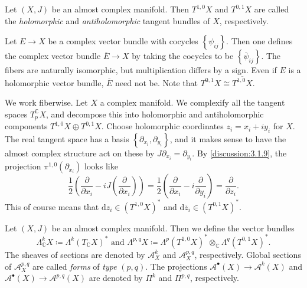 \begin{definition}\label{dfn:3.2.6}
	Let $(X,J)$ be an almost complex manifold. Then $T^{1,0} X$ and $T^{0,1} X$ are called the \emph{holomorphic} and \emph{antiholomorphic} tangent bundles of $X$, respectively.
\end{definition}
\begin{remark}\label{rmk:3.2.7}
	Let $E\to X$ be a complex vector bundle with cocycles $\left\{ \psi _{ij}  \right\} $. Then one defines the complex vector bundle $\overline{E} \to X$ by taking the cocycles to be $\left\{ \overline{\psi } _{ij}  \right\} $. The fibers are naturally isomorphic, but multiplication differs by a sign. Even if $E$ is a holomorphic vector bundle, $\overline{E} $ need not be. Note that $T^{0,1} X \cong \overline{T^{1,0} X} $.
\end{remark}
\begin{intuition}\label{intuition:3.2.8}
	We work fiberwise. Let $X$ a complex manifold. We complexify all the tangent spaces $T_p^\mathbb{C} X$, and decompose this into holomorphic and antiholomorphic components $T^{1,0} X \oplus T^{0,1} X$. Choose holomorphic coordinates $z_i = x_i + iy_i$ for $X$. The real tangent space has a basis $\left\{ \partial _{x_i} ,\partial _{y_i}  \right\} $, and it makes sense to have the almost complex structure act on these by $J\partial _{x_i} =\partial _{y_i} $. By \cref{discussion:3.1.9}, the projection $\pi ^{1,0} (\partial _{x_i} )$ looks like
	\[
		\frac{1}{2} \left( \frac{\partial }{\partial x_i} -i J\left( \frac{\partial }{\partial x_i}  \right)  \right) =\frac{1}{2} \left( \frac{\partial }{\partial x_i} -i \frac{\partial }{\partial y_i}  \right)=\frac{\partial }{\partial z_i}
	.\]
	This of course means that $\mathrm{d} z_i\in (T^{1,0} X)^*$ and $\mathrm{d} \overline{z} _i\in (T^{0,1} X)^*$.
\end{intuition}

\begin{definition}\label{dfn:3.2.9}
	Let $(X,J)$ be an almost complex manifold. Then we define the vector bundles
	\[
		\Lambda_\mathbb{C}^kX \coloneqq \Lambda ^k(T_\mathbb{C} X)^*\text{ and } \Lambda ^{p,q}X\coloneqq \Lambda ^p(T^{1,0} X)^*\otimes _\mathbb{C} \Lambda ^q(T^{0,1} X)^*
	.\]
	The sheaves of sections are denoted by $\mathcal{A} ^k_X$ and $\mathcal{A} ^{p,q} _X$, respectively. Global sections of $\mathcal{A} ^{p,q}_X$ are called \emph{forms} of \emph{type} $(p,q)$. The projections $\mathcal{A} ^{\bullet}(X)\to \mathcal{A} ^{k} (X)$ and $\mathcal{A} ^{\bullet} (X)\to \mathcal{A} ^{p,q} (X)$ are denoted by $\Pi ^k$ and $\Pi ^{p,q} $, respectively.
\end{definition}

